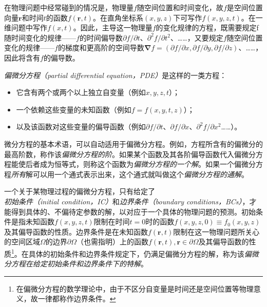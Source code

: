\documentclass[main.tex]{subfiles}
\begin{document}
在物理问题中经常碰到的情况是，物理量$f$随空间位置和时间变化，故$f$是空间位置向量$\mathbf{r}$和时间$t$的函数$f\left(\mathbf{r},t\right)$。在直角坐标系$\left(x,y,z\right)$下可写作$f\left(x,y,z,t\right)$。在一维问题中写作$f\left(x,t\right)$。因此，主导这一物理量$f$的变化规律的方程，既需要规定f随时间变化的规律——$f$的时间偏导数$\partial f/\partial t$、$\partial^2 f/\partial t^2$、……，又要规定$f$随空间位置变化的规律——$f$的梯度和更高阶的空间导数$\boldsymbol{\nabla}f=\left(\partial f/\partial x, \partial f/\partial y,\partial f/\partial z\right)$、……，因此将含有$f$的偏导数。

\emph{偏微分方程（partial differential equation，PDE）}是这样的一类方程：
\begin{itemize}
    \item 它含有两个或两个以上独立自变量（例如$x,y,z,t$）；
    \item 一个依赖这些变量的未知函数（例如$f=f\left(x,y,t,z\right)$）；
    \item 以及该函数对这些变量的偏导函数（例如$\partial f/\partial t$、$\partial f/\partial x$、$\partial^2 f/\partial x^2$……）。
\end{itemize}

微分方程的基本术语\cite[\S 10]{华工高数2009下}，可以自动适用于偏微分方程。例如，方程所含有的偏微分的最高阶数，称作该\emph{偏微分方程的阶}。如果某个函数及其各阶偏导函数代入偏微分方程能使后者成为恒等式，则称这个函数为\emph{偏微分方程的一个解}。如果一个偏微分方程\emph{所有}解可以用一个通式表示出来，这个通式就叫做这个\emph{偏微分方程的通解}。

一个关于某物理过程的偏微分方程，只有给定了\emph{初始条件（initial condition，IC）}和\emph{边界条件（boundary conditions，BCs）}，才能得到具体的、不偏待定参数的解，以对应于一个具体的物理问题的预测。初始条件是指未知函数$f\left(x,y,z,t\right)$限制在时间$t=0$时的函数$f\left(x,y,z,0\right)\equiv f_0\left(x,y,z\right)$及其偏导函数的性质。边界条件是在未知函数$f\left(\mathbf{r},t\right)$限制在这一物理问题所关心的空间区域$\Omega$的边界$\partial\Omega$（也需指明）上的函数$f\left(\mathbf{r},t\right),\mathbf{r}\in\partial\Omega$及其偏导函数的性质\footnote{在偏微分方程的数学理论中，由于不区分自变量是时间还是空间位置等物理意义，故一律都称作边界条件。}。在具体的初始条件和边界条件规定下，仍满足偏微分方程的解，称为该\emph{偏微分方程在给定初始条件和边界条件下的特解}。
\end{document}
